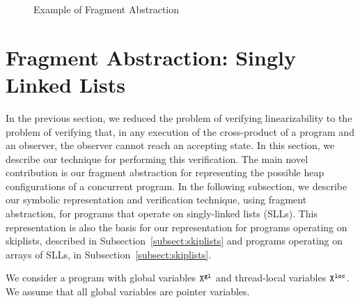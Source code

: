 \begin{center}
\begin{figure}

\caption{Example of Fragment Abstraction}
\label{lazylist}
\end{figure}
\end{center}
\section{Fragment Abstraction: Singly Linked Lists}
\label{sec:fragment-abstraction}
In the previous section, we reduced the problem of verifying linearizability
to the problem of verifying
that, in any execution of the cross-product of a program and an observer, 
the observer cannot reach an accepting state.
In this section, we describe our technique for performing this verification.
The main novel contribution is our fragment abstraction for
representing the possible heap configurations of a concurrent program.
In the following subsection, we describe our symbolic representation and
verification technique, using fragment
abstraction, for programs that operate on singly-linked lists (SLLs). This
representation is also the basis for our representation for programs
operating on skiplists, described in Subsection~\ref{subsect:skiplists}
and programs operating on arrays of SLLs, in Subsection~\ref{subsect:skiplists}.

We consider a program with global variables ${\tt X}^{\tt gl}$ and
thread-local variables ${\tt X}^{\tt loc}$.
We assume that all global variables are pointer variables.



